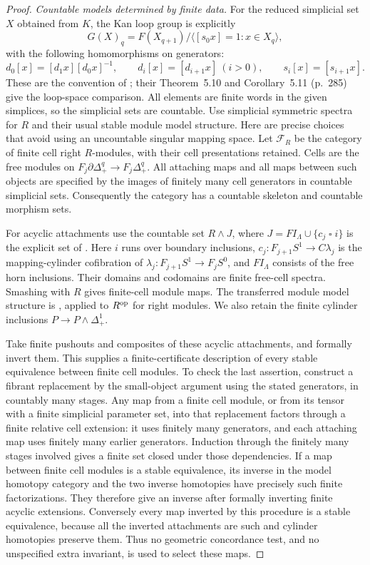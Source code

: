 \begin{proof}
\emph{Countable models determined by finite data.}
For the reduced simplicial set $X$ obtained from $K$, the Kan loop
group is explicitly
\[
 G(X)_q=F(X_{q+1})/\langle[s_0x]=1:x\in X_q\rangle,
\]
with the following homomorphisms on generators:
\[
 d_0[x]=[d_1x][d_0x]^{-1},\qquad
 d_i[x]=[d_{i+1}x]\ (i>0),\qquad
 s_i[x]=[s_{i+1}x].
\]
These are the convention of \cite[V.5, (5.1), p.~276]
{GoerssJardine1999}; their Theorem~5.10 and Corollary~5.11
(p.~285) give the loop-space comparison. All elements are finite
words in the given simplices, so the simplicial sets are countable.
Use simplicial symmetric spectra for $R$ and their usual
stable module model structure. Here are precise choices that avoid
using an uncountable singular mapping space. Let $\mathcal F_R$
be the category of finite cell right $R$-modules, with their cell
presentations retained. Cells are the free modules on
$F_j\partial\Delta^q_+\to F_j\Delta^q_+$. All attaching maps and all
maps between such objects are specified by the images of finitely
many cell generators in countable simplicial sets. Consequently the
category has a countable skeleton and countable morphism sets.

For acyclic attachments use the countable set $R\wedge J$, where
$J=FI_\Lambda\cup\{c_j\mathbin\square i\}$ is the explicit set of
\cite[Definition~3.4.9, pp.~181--182; Theorem~3.4.4, p.~180]
{HoveyShipleySmith2000}. Here $i$ runs over boundary inclusions,
$c_j:F_{j+1}S^1\to C\lambda_j$ is the mapping-cylinder
cofibration of $\lambda_j:F_{j+1}S^1\to F_jS^0$, and
$FI_\Lambda$ consists of the free horn inclusions. Their domains
and codomains are finite free-cell spectra. Smashing with $R$
gives finite-cell module maps. The transferred module model
structure is \cite[Theorem~4.1(1), pp.~498--499; proof p.~504]
{SchwedeShipley2000}, applied to $R^{\rm op}$ for right modules.
We also retain the finite cylinder inclusions
$P\to P\wedge\Delta^1_+$.

Take finite pushouts and composites of these acyclic attachments,
and formally invert them. This supplies a finite-certificate description
of every stable equivalence between finite cell modules. To check the
last assertion, construct a fibrant replacement by the small-object
argument using the stated generators, in countably many stages. Any
map from a finite cell module, or from its tensor with a finite
simplicial parameter set, into that replacement factors through a
finite relative cell extension: it uses finitely many generators,
and each attaching map uses finitely many earlier generators.
Induction through the finitely many stages involved gives a finite
set closed under those dependencies. If a map between finite cell
modules is a stable equivalence, its inverse in the model homotopy
category and the two inverse homotopies have precisely such finite
factorizations. They therefore give an inverse after formally
inverting finite acyclic extensions. Conversely every map inverted
by this procedure is a stable equivalence, because all the inverted
attachments are such and cylinder homotopies preserve them. Thus
no geometric concordance test, and no unspecified extra invariant,
is used to select these maps.


\end{proof}
